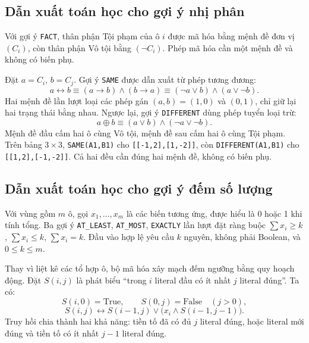 \subsection{Dẫn xuất toán học cho gợi ý nhị phân}
\label{subsec:dan-xuat-nhi-phan}

Với gợi ý \texttt{FACT}, thân phận Tội phạm của ô $i$ được mã hóa bằng mệnh đề đơn vị $(C_i)$, còn thân phận Vô tội bằng $(\neg C_i)$. Phép mã hóa cần một mệnh đề và không có biến phụ.

Đặt $a=C_i$, $b=C_j$. Gợi ý \texttt{SAME} được dẫn xuất từ phép tương đương:
\[
a\leftrightarrow b
\equiv(a\rightarrow b)\land(b\rightarrow a)
\equiv(\neg a\lor b)\land(a\lor\neg b).
\]
Hai mệnh đề lần lượt loại các phép gán $(a,b)=(1,0)$ và $(0,1)$, chỉ giữ lại hai trạng thái bằng nhau. Ngược lại, gợi ý \texttt{DIFFERENT} dùng phép tuyển loại trừ:
\[
a\oplus b\equiv(a\lor b)\land(\neg a\lor\neg b).
\]
Mệnh đề đầu cấm hai ô cùng Vô tội, mệnh đề sau cấm hai ô cùng Tội phạm. Trên bảng $3\times3$, \texttt{SAME(A1,B1)} cho \texttt{[[-1,2],[1,-2]]}, còn \texttt{DIFFERENT(A1,B1)} cho \texttt{[[1,2],[-1,-2]]}. Cả hai đều cần đúng hai mệnh đề, không có biến phụ.

\subsection{Dẫn xuất toán học cho gợi ý đếm số lượng}
\label{subsec:dan-xuat-dem-so-luong}

Với vùng gồm $m$ ô, gọi $x_1,\ldots,x_m$ là các biến tương ứng, được hiểu là 0 hoặc 1 khi tính tổng. Ba gợi ý \texttt{AT\_LEAST}, \texttt{AT\_MOST}, \texttt{EXACTLY} lần lượt đặt ràng buộc $\sum x_i\ge k$, $\sum x_i\le k$, $\sum x_i=k$. Đầu vào hợp lệ yêu cầu $k$ nguyên, không phải Boolean, và $0\le k\le m$.

Thay vì liệt kê các tổ hợp ô, bộ mã hóa xây mạch đếm ngưỡng bằng quy hoạch động. Đặt $S(i,j)$ là phát biểu ``trong $i$ literal đầu có ít nhất $j$ literal đúng''. Ta có:
\[
S(i,0)=\text{True},\qquad S(0,j)=\text{False}\quad(j>0),
\]
\[
S(i,j)\leftrightarrow S(i-1,j)\lor\bigl(x_i\land S(i-1,j-1)\bigr).
\]
Truy hồi chia thành hai khả năng: tiền tố đã có đủ $j$ literal đúng, hoặc literal mới đúng và tiền tố có ít nhất $j-1$ literal đúng.

